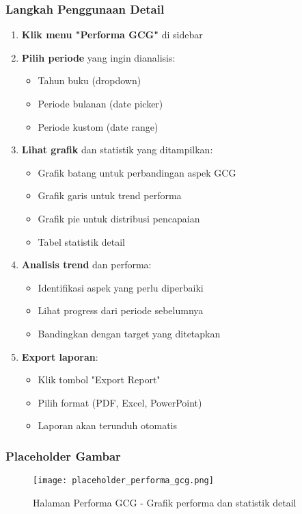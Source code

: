 \documentclass[12pt,a4paper]{article}
\begin{document}
\subsubsection{Langkah Penggunaan Detail}
\begin{enumerate}
\item \textbf{Klik menu "Performa GCG"} di sidebar
\item \textbf{Pilih periode} yang ingin dianalisis:
\begin{itemize}
\item Tahun buku (dropdown)
\item Periode bulanan (date picker)
\item Periode kustom (date range)
\end{itemize}
\item \textbf{Lihat grafik} dan statistik yang ditampilkan:
\begin{itemize}
\item Grafik batang untuk perbandingan aspek GCG
\item Grafik garis untuk trend performa
\item Grafik pie untuk distribusi pencapaian
\item Tabel statistik detail
\end{itemize}
\item \textbf{Analisis trend} dan performa:
\begin{itemize}
\item Identifikasi aspek yang perlu diperbaiki
\item Lihat progress dari periode sebelumnya
\item Bandingkan dengan target yang ditetapkan
\end{itemize}
\item \textbf{Export laporan}:
\begin{itemize}
\item Klik tombol "Export Report"
\item Pilih format (PDF, Excel, PowerPoint)
\item Laporan akan terunduh otomatis
\end{itemize}
\end{enumerate}

\subsubsection{Placeholder Gambar}
\begin{figure}[H]
\centering
\texttt{[image: placeholder\_performa\_gcg.png]}
\caption{Halaman Performa GCG - Grafik performa dan statistik detail}
\label{fig:performa_gcg}
\end{figure}
\end{document}
